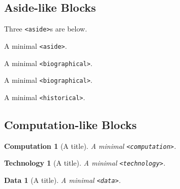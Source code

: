 \documentclass[pdflatex]{sn-jnl}
\theoremstyle{thmstyleone}%
\theoremstyle{thmstyletwo}%
\theoremstyle{thmstylethree}%
\newtheorem{computation}[theorem]{Computation}
\newtheorem{technology}[theorem]{Technology}
\newtheorem{data}[theorem]{Data}
\newcommand{\mono}[1]{\texttt{#1}}
\numberwithin{equation}{section}
\begin{document}
\subsection{Aside-like Blocks}\label{block-samples-aside-like}%
Three \mono{<aside>}s are below.%
\begin{aside}[A title.]\label{block-samples-aside-like-3}%
%
A minimal \mono{<aside>}.%
\end{aside}
\begin{biographical}[A title.]\label{block-samples-aside-like-4}%
%
A minimal \mono{<biographical>}.%
\end{biographical}
\begin{biographical}[A title.]\label{block-samples-aside-like-5}%
%
A minimal \mono{<biographical>}.%
\end{biographical}
\begin{historical}[A title.]\label{block-samples-aside-like-6}%
%
A minimal \mono{<historical>}.%
\end{historical}
%
%
\typeout{************************************************}
\typeout{************************************************}
%
\subsection{Computation-like Blocks}\label{block-samples-computation-like}%
\begin{computation}[A title]\label{block-samples-computation-like-2}%
%
A minimal \mono{<computation>}.%
\end{computation}
\begin{technology}[A title]\label{block-samples-computation-like-3}%
%
A minimal \mono{<technology>}.%
\end{technology}
\begin{data}[A title]\label{block-samples-computation-like-4}%
%
A minimal \mono{<data>}.%
\end{data}
%
%
\typeout{************************************************}
\typeout{************************************************}
%
\end{document}
